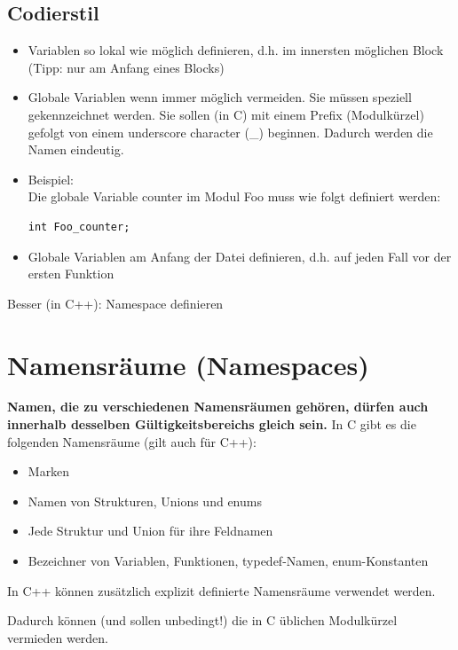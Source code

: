 \subsection{Codierstil}
\label{sec:Codierstil}
\begin{itemize}
	\item Variablen so lokal wie möglich definieren, d.h. im innersten möglichen Block (Tipp: nur am Anfang eines Blocks)
	\item Globale Variablen wenn immer möglich vermeiden. Sie müssen speziell gekennzeichnet werden. Sie sollen (in C) mit einem Prefix (Modulkürzel) gefolgt von einem underscore character (\_) beginnen. Dadurch werden die Namen eindeutig.
	\item[\-] Beispiel:\\Die globale Variable counter im Modul Foo muss wie folgt definiert werden:
	\noindent
\begin{minipage}{\linewidth}
\begin{lstlisting}
int Foo_counter;
\end{lstlisting}
\end{minipage}
	\item Globale Variablen am Anfang der Datei definieren, d.h. auf jeden Fall vor der ersten Funktion
\end{itemize}
\begin{hinweis}
Besser (in C++): Namespace definieren
\end{hinweis}


\section{Namensräume (Namespaces)}
\label{sec:Namensraeume (Namespaces)}
\textbf{Namen, die zu verschiedenen Namensräumen gehören, dürfen auch innerhalb desselben Gültigkeitsbereichs gleich sein.}
In C gibt es die folgenden Namensräume (gilt auch für C++):
\begin{itemize}
	\item Marken
	\item Namen von Strukturen, Unions und enums
	\item Jede Struktur und Union für ihre Feldnamen
	\item Bezeichner von Variablen, Funktionen, typedef-Namen, enum-Konstanten
\end{itemize}
In C++ können zusätzlich explizit definierte Namensräume verwendet werden.\\
\begin{hinweis}
Dadurch können (und sollen unbedingt!) die in C üblichen Modulkürzel vermieden werden.
\end{hinweis}

